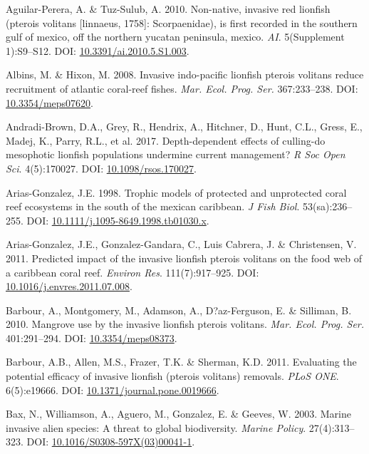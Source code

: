 \documentclass[12pt,]{article}
\begin{document}
\hypertarget{ref-aguilarperera_2010}{}
Aguilar-Perera, A. \& Tuz-Sulub, A. 2010. Non-native, invasive red
lionfish (pterois volitans {[}linnaeus, 1758{]}: Scorpaenidae), is first
recorded in the southern gulf of mexico, off the northern yucatan
peninsula, mexico. \emph{AI}. 5(Supplement 1):S9--S12. DOI:
\href{https://doi.org/10.3391/ai.2010.5.S1.003}{10.3391/ai.2010.5.S1.003}.

\hypertarget{ref-albins_2008}{}
Albins, M. \& Hixon, M. 2008. Invasive indo-pacific lionfish pterois
volitans reduce recruitment of atlantic coral-reef fishes. \emph{Mar.
Ecol. Prog. Ser.} 367:233--238. DOI:
\href{https://doi.org/10.3354/meps07620}{10.3354/meps07620}.

\hypertarget{ref-andradibrown_2017}{}
Andradi-Brown, D.A., Grey, R., Hendrix, A., Hitchner, D., Hunt, C.L.,
Gress, E., Madej, K., Parry, R.L., et al. 2017. Depth-dependent effects
of culling-do mesophotic lionfish populations undermine current
management? \emph{R Soc Open Sci}. 4(5):170027. DOI:
\href{https://doi.org/10.1098/rsos.170027}{10.1098/rsos.170027}.

\hypertarget{ref-ariasgonzalez_1998}{}
Arias-Gonzalez, J.E. 1998. Trophic models of protected and unprotected
coral reef ecosystems in the south of the mexican caribbean. \emph{J
Fish Biol}. 53(sa):236--255. DOI:
\href{https://doi.org/10.1111/j.1095-8649.1998.tb01030.x}{10.1111/j.1095-8649.1998.tb01030.x}.

\hypertarget{ref-ariasgonzalez_2011}{}
Arias-Gonzalez, J.E., Gonzalez-Gandara, C., Luis Cabrera, J. \&
Christensen, V. 2011. Predicted impact of the invasive lionfish pterois
volitans on the food web of a caribbean coral reef. \emph{Environ Res}.
111(7):917--925. DOI:
\href{https://doi.org/10.1016/j.envres.2011.07.008}{10.1016/j.envres.2011.07.008}.

\hypertarget{ref-barbour_2010}{}
Barbour, A., Montgomery, M., Adamson, A., D?az-Ferguson, E. \& Silliman,
B. 2010. Mangrove use by the invasive lionfish pterois volitans.
\emph{Mar. Ecol. Prog. Ser.} 401:291--294. DOI:
\href{https://doi.org/10.3354/meps08373}{10.3354/meps08373}.

\hypertarget{ref-barbour_2011}{}
Barbour, A.B., Allen, M.S., Frazer, T.K. \& Sherman, K.D. 2011.
Evaluating the potential efficacy of invasive lionfish (pterois
volitans) removals. \emph{PLoS ONE}. 6(5):e19666. DOI:
\href{https://doi.org/10.1371/journal.pone.0019666}{10.1371/journal.pone.0019666}.

\hypertarget{ref-bax_2003}{}
Bax, N., Williamson, A., Aguero, M., Gonzalez, E. \& Geeves, W. 2003.
Marine invasive alien species: A threat to global biodiversity.
\emph{Marine Policy}. 27(4):313--323. DOI:
\href{https://doi.org/10.1016/S0308-597X(03)00041-1}{10.1016/S0308-597X(03)00041-1}.
\end{document}
